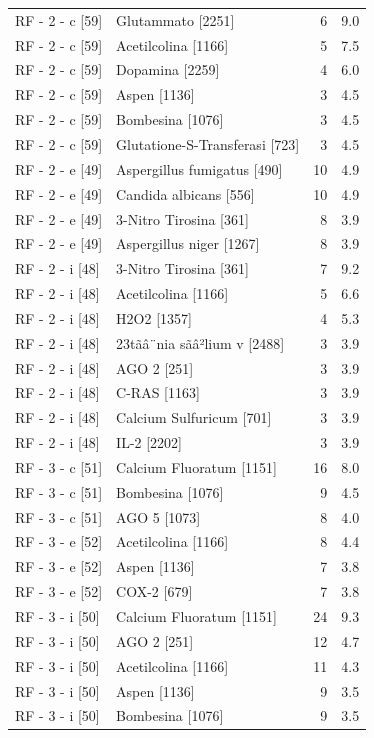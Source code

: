 \documentclass[a4paper,11pt]{article}
\begin{document}
\begin{footnotesize}
\begin{longtable}{p{3.5cm}p{7.5cm}rr}
RF - 2 - c [59] & Glutammato [2251] & 6 & 9.0 \\
RF - 2 - c [59] & Acetilcolina [1166] & 5 & 7.5 \\
RF - 2 - c [59] & Dopamina [2259] & 4 & 6.0 \\
RF - 2 - c [59] & Aspen [1136] & 3 & 4.5 \\
RF - 2 - c [59] & Bombesina [1076] & 3 & 4.5 \\
RF - 2 - c [59] & Glutatione-S-Transferasi [723] & 3 & 4.5 \\
RF - 2 - e [49] & Aspergillus fumigatus [490] & 10 & 4.9 \\
RF - 2 - e [49] & Candida albicans [556] & 10 & 4.9 \\
RF - 2 - e [49] & 3-Nitro Tirosina [361] & 8 & 3.9 \\
RF - 2 - e [49] & Aspergillus niger [1267] & 8 & 3.9 \\
RF - 2 - i [48] & 3-Nitro Tirosina [361] & 7 & 9.2 \\
RF - 2 - i [48] & Acetilcolina [1166] & 5 & 6.6 \\
RF - 2 - i [48] & H2O2 [1357] & 4 & 5.3 \\
RF - 2 - i [48] & 23tãâ¨nia sãâ²lium v [2488] & 3 & 3.9 \\
RF - 2 - i [48] & AGO 2 [251] & 3 & 3.9 \\
RF - 2 - i [48] & C-RAS [1163] & 3 & 3.9 \\
RF - 2 - i [48] & Calcium Sulfuricum [701] & 3 & 3.9 \\
RF - 2 - i [48] & IL-2 [2202] & 3 & 3.9 \\
RF - 3 - c [51] & Calcium Fluoratum [1151] & 16 & 8.0 \\
RF - 3 - c [51] & Bombesina [1076] & 9 & 4.5 \\
RF - 3 - c [51] & AGO 5 [1073] & 8 & 4.0 \\
RF - 3 - e [52] & Acetilcolina [1166] & 8 & 4.4 \\
RF - 3 - e [52] & Aspen [1136] & 7 & 3.8 \\
RF - 3 - e [52] & COX-2 [679] & 7 & 3.8 \\
RF - 3 - i [50] & Calcium Fluoratum [1151] & 24 & 9.3 \\
RF - 3 - i [50] & AGO 2 [251] & 12 & 4.7 \\
RF - 3 - i [50] & Acetilcolina [1166] & 11 & 4.3 \\
RF - 3 - i [50] & Aspen [1136] & 9 & 3.5 \\
RF - 3 - i [50] & Bombesina [1076] & 9 & 3.5 \\

\end{longtable}
\end{footnotesize}
\end{document}
